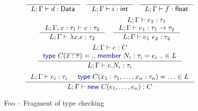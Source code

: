 \documentclass[10pt,preprint,clearpagebib]{sigplanconf}
\newcommand{\kvd}[1]{\textnormal{\textcolor{kvdclr}{\sffamily #1}}}
\newcommand{\ident}[1]{\textnormal{\sffamily #1}}
\begin{document}

\begin{figure}
\noindent  
\begin{equation*}
\inference
  {~}
  {L; \Gamma \vdash d : \ident{Data}}
~~
\inference
  {~}
  {L; \Gamma \vdash i : \ident{int}}
~~
\inference
  {~}
  {L; \Gamma \vdash f : \ident{float}}
\end{equation*}
\vspace{0.25em}
\begin{equation*}
\inference
  {L; \Gamma, x : \tau_1 \vdash e : \tau_2}
  {L; \Gamma \vdash \lambda x.e : \tau_2}
\quad
\inference
  {L; \Gamma \vdash e_2 : \tau_1 \\
   L; \Gamma \vdash e_1 : \tau_1 \rightarrow \tau_2}
  {L; \Gamma \vdash e_1~e_2 : \tau_2}
\end{equation*}
\vspace{0.5em}
\begin{equation*}
\inference
  {L; \Gamma \vdash e : C \\ \kvd{type}~C(\overline{x:\tau}) = ..\;\kvd{member}~N_i : \tau_i = e_i\;.. \in L}
  {L; \Gamma \vdash e.N_i:\tau_i}
\end{equation*}
\vspace{0.25em}
\begin{equation*}
\inference
  {L; \Gamma \vdash e_i : \tau_i & \kvd{type}~C(x_1:\tau_1, \ldots, x_n:\tau_n) = \ldots \in L}
  {L; \Gamma \vdash \kvd{new}~C(e_1, \ldots, e_n):C}
\end{equation*}

\caption{Foo -- Fragment of type checking}
\label{fig:ff-typecheck}
\end{figure}

\end{document}

